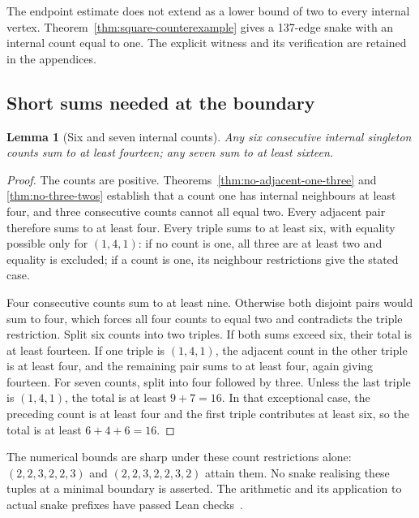 \documentclass[11pt,a4paper]{article}
\newtheorem{lemma}[theorem]{Lemma}
\theoremstyle{definition}
\theoremstyle{remark}
\begin{document}
The endpoint estimate does not extend as a lower bound of two to every internal vertex. Theorem~\ref{thm:square-counterexample} gives a 137-edge snake with an internal count equal to one. The explicit witness and its verification are retained in the appendices.

\subsection{Short sums needed at the boundary}
\begin{lemma}[Six and seven internal counts]\label{lem:boundary-short-sums}
Any six consecutive internal singleton counts sum to at least fourteen;
any seven sum to at least sixteen.
\end{lemma}
\begin{proof}
The counts are positive. Theorems~\ref{thm:no-adjacent-one-three} and
\ref{thm:no-three-twos} establish that a count one has internal neighbours
at least four, and three consecutive counts cannot all equal two.
Every adjacent pair therefore sums to at least four. Every triple sums
to at least six, with equality possible only for $(1,4,1)$: if no count
is one, all three are at least two and equality is excluded; if a count
is one, its neighbour restrictions give the stated case.

Four consecutive counts sum to at least nine. Otherwise both disjoint
pairs would sum to four, which forces all four counts to equal two and
contradicts the triple restriction. Split six counts into two triples.
If both sums exceed six, their total is at least fourteen. If one triple
is $(1,4,1)$, the adjacent count in the other triple is at least four,
and the remaining pair sums to at least four, again giving fourteen.
For seven counts, split into four followed by three. Unless the last
triple is $(1,4,1)$, the total is at least $9+7=16$. In that exceptional
case, the preceding count is at least four and the first triple contributes
at least six, so the total is at least $6+4+6=16$.
\end{proof}
The numerical bounds are sharp under these count restrictions alone:
$(2,2,3,2,2,3)$ and $(2,2,3,2,2,3,2)$ attain them. No snake realising
these tuples at a minimal boundary is asserted. The arithmetic and its
application to actual snake prefixes have passed Lean checks~\cite{boundary175archive}.
\end{document}
